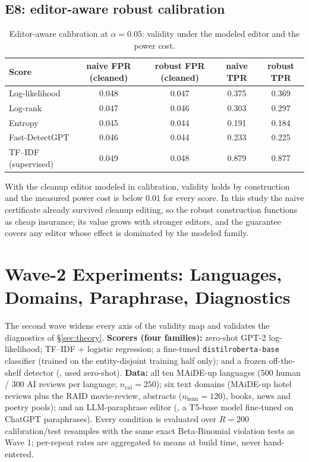 \documentclass[11pt]{article}
\begin{document}
\subsection{E8: editor-aware robust calibration}
\begin{table}[H]\centering
\caption{Editor-aware calibration at $\alpha=0.05$: validity under the modeled editor and the power cost.}
\label{tab:e8}
\small
\begin{tabular}{lcccc}
\toprule
Score & naive FPR (cleaned) & robust FPR (cleaned) & naive TPR & robust TPR \\
\midrule
Log-likelihood & 0.048 & 0.047 & 0.375 & 0.369 \\
Log-rank & 0.047 & 0.046 & 0.303 & 0.297 \\
Entropy & 0.045 & 0.044 & 0.191 & 0.184 \\
Fast-DetectGPT & 0.046 & 0.044 & 0.233 & 0.225 \\
TF--IDF (supervised) & 0.049 & 0.048 & 0.879 & 0.877 \\
\bottomrule
\end{tabular}
\end{table}
With the cleanup editor modeled in calibration, validity holds by construction and the measured power cost is below $0.01$ for every score. In this study the naive certificate already survived cleanup editing, so the robust construction functions as cheap insurance; its value grows with stronger editors, and the guarantee covers any editor whose effect is dominated by the modeled family.
\section{Wave-2 Experiments: Languages, Domains, Paraphrase, Diagnostics}
\label{sec:wave2}
The second wave widens every axis of the validity map and validates the diagnostics of \S\ref{sec:theory}. \textbf{Scorers (four families):} zero-shot GPT-2 log-likelihood; TF--IDF + logistic regression; a fine-tuned \texttt{distilroberta-base} classifier (trained on the entity-disjoint training half only); and a frozen off-the-shelf detector (, used zero-shot). \textbf{Data:} all ten MAiDE-up languages (500 human / 300 AI reviews per language; $n_{\mathrm{cal}}=250$); six text domains (MAiDE-up hotel reviews plus the RAID movie-review, abstracts ($n_{\mathrm{hum}}=120$), books, news and poetry pools); and an LLM-paraphrase editor (, a T5-base model fine-tuned on ChatGPT paraphrases). Every condition is evaluated over $R=200$ calibration/test resamples with the same exact Beta-Binomial violation tests as Wave 1; per-repeat rates are aggregated to means at build time, never hand-entered.
\end{document}
